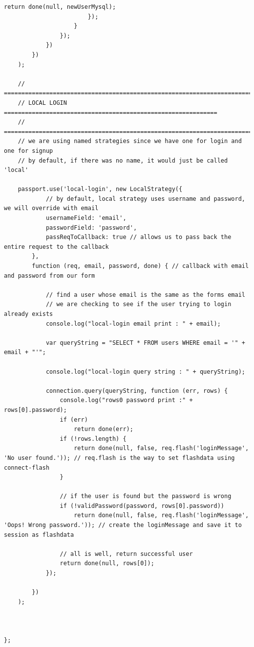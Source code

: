 \documentclass[a4paper]{article}
\begin{document}
\begin{lstlisting}[style=htmlcssjs]
                            return done(null, newUserMysql);
                        });
                    }
                });
            })
        })
    );

    // =========================================================================
    // LOCAL LOGIN =============================================================
    // =========================================================================
    // we are using named strategies since we have one for login and one for signup
    // by default, if there was no name, it would just be called 'local'

    passport.use('local-login', new LocalStrategy({
            // by default, local strategy uses username and password, we will override with email
            usernameField: 'email',
            passwordField: 'password',
            passReqToCallback: true // allows us to pass back the entire request to the callback
        },
        function (req, email, password, done) { // callback with email and password from our form

            // find a user whose email is the same as the forms email
            // we are checking to see if the user trying to login already exists
            console.log("local-login email print : " + email);

            var queryString = "SELECT * FROM users WHERE email = '" + email + "'";

            console.log("local-login query string : " + queryString);

            connection.query(queryString, function (err, rows) {
                console.log("rows0 password print :" + rows[0].password);
                if (err)
                    return done(err);
                if (!rows.length) {
                    return done(null, false, req.flash('loginMessage', 'No user found.')); // req.flash is the way to set flashdata using connect-flash
                }

                // if the user is found but the password is wrong
                if (!validPassword(password, rows[0].password))
                    return done(null, false, req.flash('loginMessage', 'Oops! Wrong password.')); // create the loginMessage and save it to session as flashdata

                // all is well, return successful user
                return done(null, rows[0]);
            });

        })
    );



};
\end{lstlisting}\hspace*{\fill} \\
\end{document}

